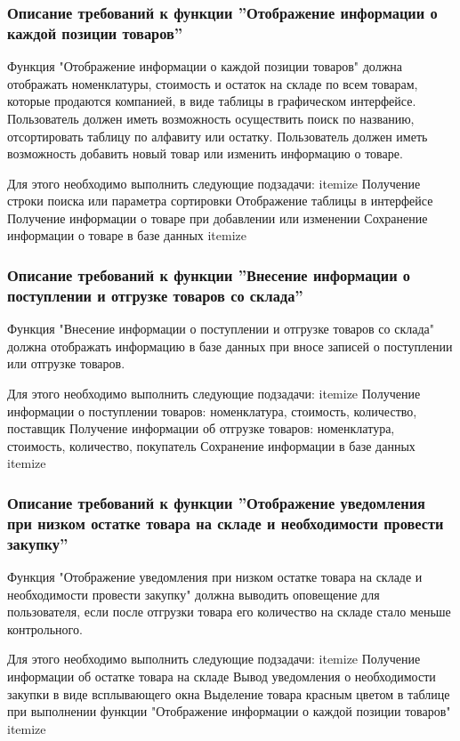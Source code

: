 \documentclass[russian, utf8, 12pt,pointsubsection,floatsubsection]{eskdtext}
\begin{document}
\subsubsection{Описание требований к функции ''Отображение информации о каждой позиции товаров''}
Функция "Отображение информации о каждой позиции товаров" должна отображать номенклатуры, стоимость и остаток на складе по всем товарам, которые продаются компанией, в виде таблицы в графическом интерфейсе. Пользователь должен иметь возможность осуществить поиск по названию, отсортировать таблицу по алфавиту или остатку. Пользователь должен иметь возможность добавить новый товар или изменить информацию о товаре.

Для этого необходимо выполнить следующие подзадачи:
itemize
Получение строки поиска или параметра сортировки
Отображение таблицы в интерфейсе
Получение информации о товаре при добавлении или изменении
Сохранение информации о товаре в базе данных
itemize

\subsubsection{Описание требований к функции ''Внесение информации о поступлении и отгрузке товаров со склада''}
Функция "Внесение информации о поступлении и отгрузке товаров со склада" должна отображать информацию в базе данных при вносе записей о поступлении или отгрузке товаров.

Для этого необходимо выполнить следующие подзадачи:
itemize
Получение информации о поступлении товаров: номенклатура, стоимость, количество, поставщик
Получение информации об отгрузке товаров: номенклатура, стоимость, количество, покупатель
Сохранение информации в базе данных
itemize

\subsubsection{Описание требований к функции ''Отображение уведомления при низком остатке товара на складе и необходимости провести закупку''}
Функция "Отображение уведомления при низком остатке товара на складе и необходимости провести закупку" должна выводить оповещение для пользователя, если после отгрузки товара его количество на складе стало меньше контрольного.

Для этого необходимо выполнить следующие подзадачи:
itemize
Получение информации об остатке товара на складе
Вывод уведомления о необходимости закупки в виде всплывающего окна
Выделение товара красным цветом в таблице при выполнении функции "Отображение информации о каждой позиции товаров"
itemize
\end{document}
